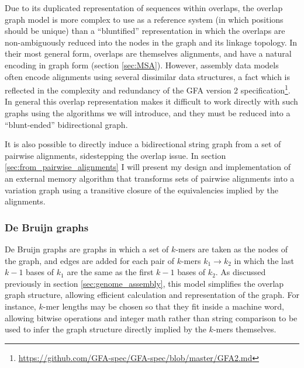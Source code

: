 Due to its duplicated representation of sequences within overlaps, the overlap graph model is more complex to use as a reference system (in which positions should be unique) than a ``bluntified'' representation in which the overlaps are non-ambiguously reduced into the nodes in the graph and its linkage topology.
In their most general form, overlaps are themselves alignments, and have a natural encoding in graph form (section \ref{sec:MSA}).
However, assembly data models often encode alignments using several dissimilar data structures, a fact which is reflected in the complexity and redundancy of the GFA version 2 specification\footnote{\url{https://github.com/GFA-spec/GFA-spec/blob/master/GFA2.md}}.
In general this overlap representation makes it difficult to work directly with such graphs using the algorithms we will introduce, and they must be reduced into a ``blunt-ended'' bidirectional graph.


It is also possible to directly induce a bidirectional string graph from a set of pairwise alignments, sidestepping the overlap issue.
In section \ref{sec:from_pairwise_alignments} I will present my design and implementation of an external memory algorithm that transforms sets of pairwise alignments into a variation graph using a transitive closure of the equivalencies implied by the alignments.

\subsubsection{De Bruijn graphs}
\label{sec:de_bruijn_graphs}

De Bruijn graphs \cite{de1946combinatorial} are graphs in which a set of $k$-mers are taken as the nodes of the graph, and edges are added for each pair of $k$-mers $k_1 \rightarrow k_2$ in which the last $k-1$ bases of $k_1$ are the same as the first $k-1$ bases of $k_2$.
As discussed previously in section \ref{sec:genome_assembly}, this model simplifies the overlap graph structure, allowing efficient calculation and representation of the graph.
For instance, $k$-mer lengths may be chosen so that they fit inside a machine word, allowing bitwise operations and integer math rather than string comparison to be used to infer the graph structure directly implied by the $k$-mers themselves.

